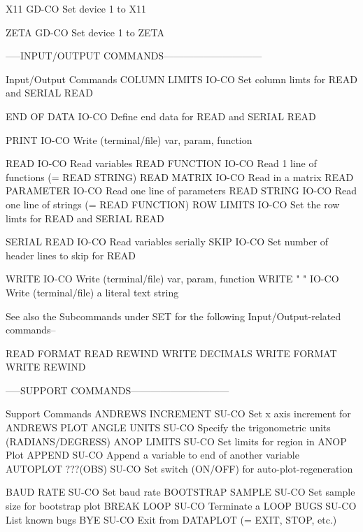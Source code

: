 X11                         GD-CO Set device 1 to X11

ZETA                        GD-CO Set device 1 to ZETA

-----INPUT/OUTPUT COMMANDS------------------------------

Input/Output Commands
COLUMN LIMITS               IO-CO Set column limts for READ and SERIAL READ

END OF DATA                 IO-CO Define end data for READ and SERIAL READ

PRINT                       IO-CO Write (terminal/file) var, param, function

READ                        IO-CO Read variables
READ FUNCTION               IO-CO Read 1 line of functions (= READ STRING)
READ MATRIX                 IO-CO Read in a matrix
READ PARAMETER              IO-CO Read one line of parameters
READ STRING                 IO-CO Read one line of strings (= READ FUNCTION)
ROW LIMITS                  IO-CO Set the row limts for READ and SERIAL READ

SERIAL READ                 IO-CO Read variables serially
SKIP                        IO-CO Set number of header lines to skip for READ

WRITE                       IO-CO Write (terminal/file) var, param, function
WRITE "  "                  IO-CO Write (terminal/file) a literal text string

See also the    Subcommands under SET    for the following
Input/Output-related commands--

    READ FORMAT
    READ REWIND
    WRITE DECIMALS
    WRITE FORMAT
    WRITE REWIND

-----SUPPORT COMMANDS------------------------------

Support Commands
ANDREWS INCREMENT           SU-CO Set x axis increment for ANDREWS PLOT
ANGLE UNITS                 SU-CO Specify the trigonometric units (RADIANS/DEGRESS)
ANOP LIMITS                 SU-CO Set limits for region in ANOP Plot
APPEND                      SU-CO Append a variable to end of another variable
AUTOPLOT ???(OBS)           SU-CO Set switch (ON/OFF) for auto-plot-regeneration

BAUD RATE                   SU-CO Set baud rate
BOOTSTRAP SAMPLE            SU-CO Set sample size for bootstrap plot 
BREAK LOOP                  SU-CO Terminate a LOOP
BUGS                        SU-CO List known bugs
BYE                         SU-CO Exit from DATAPLOT (= EXIT, STOP, etc.)

